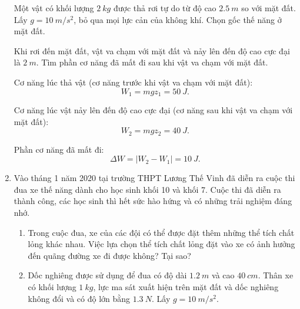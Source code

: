\begin{enumerate}[label=\bfseries Câu \arabic*:]
	
	{
		Một vật có khối lượng $\SI{2}{kg}$ được thả rơi tự do từ độ cao $\SI{2.5}{m}$ so với mặt đất. Lấy $g=\SI{10}{m/s^2}$, bỏ qua mọi lực cản của không khí. Chọn gốc thế năng ở mặt đất.
		
		Khi rơi đến mặt đất, vật va chạm với mặt đất và nảy lên đến độ cao cực đại là $\SI{2}{m}$. Tìm phần cơ năng đã mất đi sau khi vật va chạm với mặt đất.
	}
	
	\hideall
	{	
		Cơ năng lúc thả vật (cơ năng trước khi vật va chạm với mặt đất):
		$$W_1 = mgz_1 = \SI{50}{J}.$$
		
		Cơ năng lúc vật nảy lên đến độ cao cực đại (cơ năng sau khi vật va chạm với mặt đất):
		$$W_2 = mgz_2 = \SI{40}{J}.$$
		
		Phần cơ năng đã mất đi: $$\Delta W = |W_2 - W_1| = \SI{10}{J}.$$
	}
	\item {}
	
	
	{
		\begin{minipage}[l]{0.7\textwidth}
			Vào tháng 1 năm 2020 tại trường THPT Lương Thế Vinh đã diễn ra cuộc thi đua xe thế năng dành cho học sinh khối 10 và khối 7. Cuộc thi đã diễn ra thành công, các học sinh thì hết sức hào hứng và có những trải nghiệm đáng nhớ.
			\begin{enumerate}[label=\alph*)]
				\item Trong cuộc đua, xe của các đội có thể được đặt thêm những thể tích chất lỏng khác nhau. Việc lựa chọn thể tích chất lỏng đặt vào xe có ảnh hưởng đến quãng đường xe đi được không? Tại sao?
				\item Dốc nghiêng được sử dụng để đua có độ dài $\SI{1.2}{m}$ và cao $\SI{40}{cm}$. Thân xe có khối lượng $\SI{1}{kg}$, lực ma sát xuất hiện trên mặt đất và dốc nghiêng không đổi và có độ lớn bằng $\SI{1.3}{N}$. Lấy $g=\SI{10}{m/s^2}$.
				

\end{enumerate}
\end{minipage}}
\end{enumerate}
